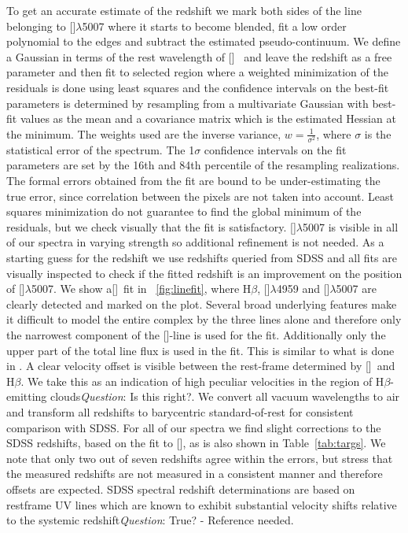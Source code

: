 \documentclass{aa}    %
\newcommand{\figref}[1]{\ref{fig:#1}}
\newcommand{\Fig}[1]{\figurename~\figref{#1}}
\newcommand{\fig}[1]{\Fig{#1}}
\newcommand{\Tab}[1]{Table~\ref{tab:#1}}
\newcommand{\tab}[1]{\Tab{#1}}
\newcommand{\hb}{H$\beta$}
\newcommand{\oiii}{[\ion{O}{iii}]}
\newcommand{\todo}[3]{{\color{#2}\emph{#1}: #3}}
\newcommand{\qtodo}[1]{\todo{Question}{red}{#1}}
\begin{document}
To get an accurate estimate of the redshift we mark both sides of the line belonging to \oiii$\lambda$5007 where it starts to become blended, fit a low order polynomial to the edges and subtract the estimated pseudo-continuum. We define a Gaussian in terms of the rest wavelength of \oiii~ and leave the redshift as a free parameter and then fit to selected region where a weighted minimization of the residuals is done using least squares and the confidence intervals on the best-fit parameters is determined by resampling from a multivariate Gaussian with best-fit values as the mean and a covariance matrix which is the estimated Hessian at the minimum. The weights used are the inverse variance, $ w =  \frac{1}{\sigma^2}$, where $\sigma$ is the statistical error of the spectrum. The 1$\sigma$ confidence intervals on the fit parameters are set by the 16th and 84th percentile of the resampling realizations. The formal errors obtained from the fit are bound to be under-estimating the true error, since correlation between the pixels are not taken into account. Least squares minimization do not guarantee to find the global minimum of the residuals, but we check visually that the fit is satisfactory. \oiii$\lambda$5007 is visible in all of our spectra in varying strength so additional refinement is not needed. As a starting guess for the redshift we use redshifts queried from SDSS and all fits are visually inspected to check if the fitted redshift is an improvement on the position of \oiii$\lambda$5007. We show a\oiii~fit in \fig{linefit}, where \hb, \oiii$\lambda$4959 and \oiii$\lambda$5007 are clearly detected and marked on the plot. Several broad underlying features make it difficult to model the entire complex by the three lines alone and therefore only the narrowest component of the \oiii-line is used for the fit. Additionally only the upper part of the total line flux is used in the fit. This is similar to what is done in \citet{VandenBerk2001}. A clear velocity offset is visible between the rest-frame determined by \oiii~and \hb. We take this as an indication of high peculiar velocities in the region of \hb-emitting clouds\qtodo{Is this right?}. We convert all vacuum wavelengths to air and transform all redshifts to barycentric standard-of-rest for consistent comparison with SDSS. For all of our spectra we find slight corrections to the SDSS redshifts, based on the fit to \oiii, as is also shown in \tab{targs}. We note that only two out of seven redshifts agree within the errors, but stress that the measured redshifts are not measured in a consistent manner and therefore offsets are expected. SDSS spectral redshift determinations are based on restframe UV lines which are known to exhibit substantial velocity shifts relative to the systemic redshift\qtodo{True? - Reference needed}.
\end{document}
